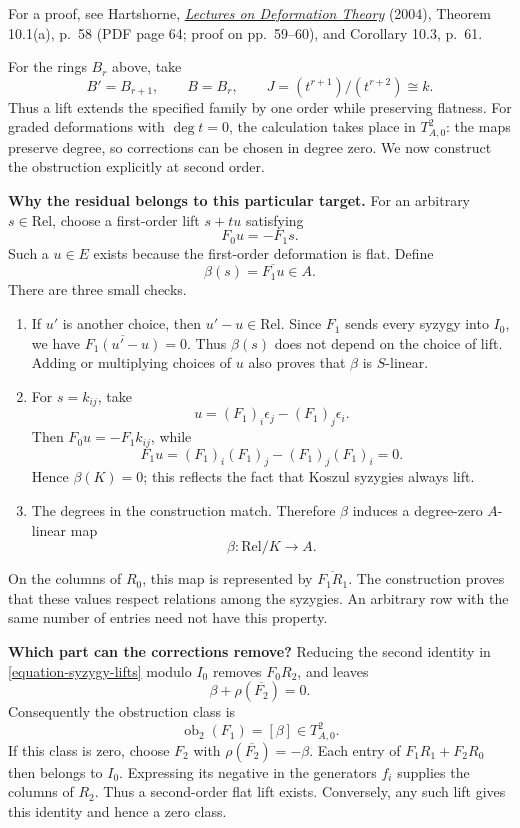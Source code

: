 \noindent
For a proof, see Hartshorne,
\href{https://math.berkeley.edu/%
\string~robin/math274root.pdf}
{\emph{Lectures on Deformation Theory}}
(2004), Theorem 10.1(a), p.~58
(PDF page 64; proof on pp.~59--60),
and Corollary 10.3, p.~61.

\medskip\noindent
For the rings $B_r$ above, take
$$
B'=B_{r+1},\qquad B=B_r,\qquad
J=(t^{r+1})/(t^{r+2})\cong k.
$$
Thus a lift extends the specified family
by one order while preserving flatness.
For graded deformations with $\deg t=0$,
the calculation takes place in
$T^2_{A,0}$: the maps preserve degree,
so corrections can be chosen in degree
zero. We now construct the obstruction
explicitly at second order.

\medskip\noindent
\textbf{Why the residual belongs to this
particular target.}
For an arbitrary $s\in\mathrm{Rel}$,
choose a first-order lift $s+tu$ satisfying
$$
F_0u=-F_1s.
$$
Such a $u\in E$ exists because the
first-order deformation is flat. Define
$$
\beta(s)=\overline{F_1u}\in A.
$$
There are three small checks.
\begin{enumerate}
\item If $u'$ is another choice, then
$u'-u\in\mathrm{Rel}$. Since $F_1$ sends
every syzygy into $I_0$, we have
$\overline{F_1(u'-u)}=0$. Thus $\beta(s)$
does not depend on the choice of lift.
Adding or multiplying choices of $u$
also proves that $\beta$ is $S$-linear.

\item For $s=k_{ij}$, take
$$
u=(F_1)_i\epsilon_j-(F_1)_j\epsilon_i.
$$
Then $F_0u=-F_1k_{ij}$, while
$$
F_1u=(F_1)_i(F_1)_j
-(F_1)_j(F_1)_i=0.
$$
Hence $\beta(K)=0$; this reflects the fact
that Koszul syzygies always lift.

\item The degrees in the construction
match. Therefore $\beta$ induces a
degree-zero $A$-linear map
$$
\beta:\mathrm{Rel}/K\longrightarrow A.
$$
\end{enumerate}
On the columns of $R_0$, this map is
represented by $\overline{F_1R_1}$.
The construction proves that these values
respect relations among the syzygies.
An arbitrary row with the same number of
entries need not have this property.

\medskip\noindent
\textbf{Which part can the corrections
remove?}
Reducing the second identity in
\ref{equation-syzygy-lifts} modulo $I_0$
removes $F_0R_2$, and leaves
$$
\beta+\rho(\overline{F_2})=0.
$$
Consequently the obstruction class is
$$
\operatorname{ob}_2(F_1)=[\beta]
\in T^2_{A,0}.
$$
If this class is zero, choose $F_2$ with
$\rho(\overline{F_2})=-\beta$. Each entry
of $F_1R_1+F_2R_0$ then belongs to $I_0$.
Expressing its negative in the generators
$f_i$ supplies the columns of $R_2$.
Thus a second-order flat lift exists.
Conversely, any such lift gives this
identity and hence a zero class.

